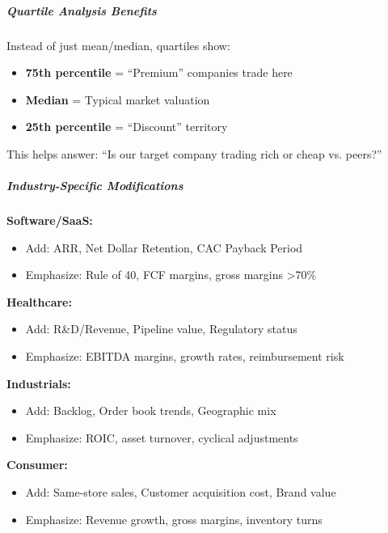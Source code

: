 \documentclass[11pt]{article}
\begin{document}
\subparagraph{Quartile Analysis Benefits}\mbox{}\par
Instead of just mean/median, quartiles show:

\begin{itemize}[leftmargin=*,itemsep=2pt,topsep=2pt]
\item {} \textbf{75th percentile} = ``Premium'' companies trade here
\item {} \textbf{Median} = Typical market valuation
\item {} \textbf{25th percentile} = ``Discount'' territory
\end{itemize}

This helps answer: ``Is our target company trading rich or cheap vs. peers?''


\subparagraph{Industry-Specific Modifications}\mbox{}\par

\textbf{Software/SaaS:}

\begin{itemize}[leftmargin=*,itemsep=2pt,topsep=2pt]
\item {} Add: ARR, Net Dollar Retention, CAC Payback Period
\item {} Emphasize: Rule of 40, FCF margins, gross margins >70\%
\end{itemize}

\textbf{Healthcare:}

\begin{itemize}[leftmargin=*,itemsep=2pt,topsep=2pt]
\item {} Add: R\&D/Revenue, Pipeline value, Regulatory status
\item {} Emphasize: EBITDA margins, growth rates, reimbursement risk
\end{itemize}

\textbf{Industrials:}

\begin{itemize}[leftmargin=*,itemsep=2pt,topsep=2pt]
\item {} Add: Backlog, Order book trends, Geographic mix
\item {} Emphasize: ROIC, asset turnover, cyclical adjustments
\end{itemize}

\textbf{Consumer:}

\begin{itemize}[leftmargin=*,itemsep=2pt,topsep=2pt]
\item {} Add: Same-store sales, Customer acquisition cost, Brand value
\item {} Emphasize: Revenue growth, gross margins, inventory turns
\end{itemize}
\end{document}

